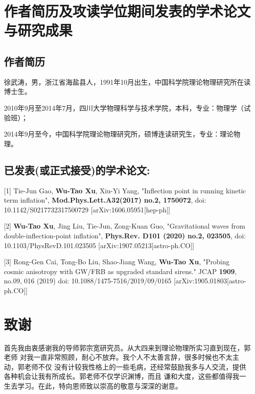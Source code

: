 \chapter{作者简历及攻读学位期间发表的学术论文与研究成果}

\section*{作者简历}

徐武涛，男，浙江省海盐县人，1991年10月出生，中国科学院理论物理研究所在读博士生。

2010年9月至2014年7月，四川大学物理科学与技术学院，本科，专业：物理学（试验班）；

2014年9月至今，中国科学院理论物理研究所，硕博连读研究生，专业：理论物理。

\section*{已发表(或正式接受)的学术论文:}

[1] Tie-Jun Gao, \textbf{Wu-Tao Xu}, Xiu-Yi Yang, "Inflection point in
running kinetic term inflation", \textbf{Mod.Phys.Lett.A32(2017) no.2,
1750072}, doi: 10.1142/S0217732317500729 [arXiv:1606.05951[hep-ph]]

[2] \textbf{Wu-Tao Xu}, Jing Liu, Tie-Jun, Zong-Kuan Guo, "Gravitational
waves from double-inflection-point inflation", \textbf{Phys.Rev. D101
(2020) no.2, 023505}, doi: 10.1103/PhysRevD.101.023505
[arXiv:1907.05213[astro-ph.CO]]

[3] Rong-Gen Cai, Tong-Bo Liu, Shao-Jiang Wang, \textbf{Wu-Tao Xu}, "Probing 
cosmic anisotropy with GW/FRB as upgraded standard sirens." JCAP
\textbf{1909}, no.09, 016 (2019) doi: 10.1088/1475-7516/2019/09/0165 
[arXiv:1905.01803[astro-ph.CO]]

\chapter[致谢]{致\quad 谢}%
\thispagestyle{noheaderstyle}%

首先我由衷感谢我的导师郭宗宽研究员。从大四来到理论物理所实习直到现在，郭老师
对我一直非常照顾，耐心不放弃。我个人不太善言辞，很多时候也不太主动，郭老师不仅
没有计较我性格上的一些毛病，还经常鼓励我多与人交流，提供各种机会让我有所成长。郭老师不仅学识渊博，而且
谦和大度，这些都值得我一生去学习。在此，特向恩师致以崇高的敬意与深深的谢意。

